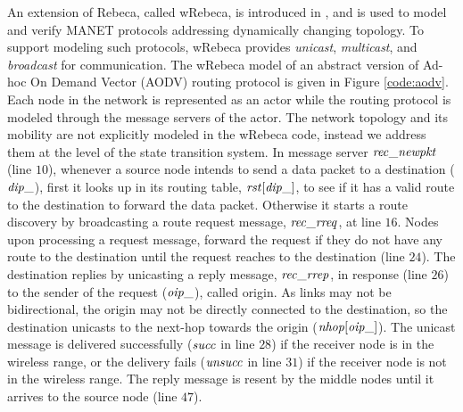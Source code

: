An extension of Rebeca, called wRebeca, is introduced in \cite{FOAC}, and is used to 
model and verify MANET protocols addressing dynamically changing topology. To support modeling such protocols, wRebeca provides \textit{unicast}, \textit{multicast}, and \textit{broadcast} for communication. The wRebeca model of an abstract version of Ad-hoc On Demand Vector (AODV) routing protocol \cite{AODV} is given in Figure \ref{code:aodv}. Each node in the network is represented as an actor while the routing protocol is modeled through the message servers of the actor. The network topology and its mobility 
are not explicitly modeled in the wRebeca code, instead we address them at the level of the state transition system.  In message server ${\it rec\_newpkt}$ (line $10$),
whenever a source node intends to send a data packet to a destination (${\it dip\_}$), first it looks up in its routing table, ${\it rst}[{\it dip\_}]$, to see if it has a valid route to the destination to forward the data packet. Otherwise it starts a route discovery by broadcasting a route request message, ${\it rec\_rreq}$, at line $16$. Nodes upon processing a request message, forward the request if they do not have any route to the destination until the request reaches to the destination (line $24$). The destination replies by unicasting a reply message, ${\it rec\_rrep}$, in response (line $26$) to the sender of the request (${\it oip\_}$), called origin. As links may not be bidirectional, the origin may not be directly connected to the destination, so the destination unicasts to the next-hop towards the origin (${\it nhop}[{\it oip\_}]$). The unicast message is delivered
successfully ($\it succ$ in line $28$) if the receiver node is in the wireless range, or the
delivery fails ($\it unsucc$ in line $31$) if the receiver node is not in the wireless range. The reply message is resent by the middle nodes until it arrives to the source node (line $47$).


\begin{figure*}
	\begin{center}
		
	\end{center}
	\caption{The AODV protocol specified by wRebeca \label{code:aodv}\cite{FOAC}}
\end{figure*} 


